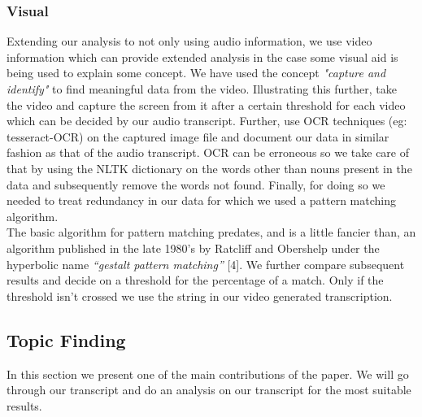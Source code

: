 \documentclass[conference]{IEEEtran}
\begin{document}
\subsubsection{Visual}
Extending our analysis to not only using audio information, we use video information which can provide extended analysis in the case some visual aid is being used to explain some concept. We have used the concept \textit{"capture and identify"} to find meaningful data from the video. Illustrating this further, take the video and capture the screen from it after a certain threshold for each video which can be decided by our audio transcript. Further, use OCR techniques (eg: tesseract-OCR) on the captured image file and document our data in similar fashion as that of the audio transcript. OCR can be erroneous so we take care of that by using the NLTK dictionary on the words other than nouns present in the data and subsequently remove the words not found. Finally, for doing so we needed to treat redundancy in our data for which we used a pattern matching algorithm.\\
\indent The basic algorithm for pattern matching predates, and is a little fancier than, an algorithm published in the late 1980’s by Ratcliff and Obershelp under the hyperbolic name \textit{“gestalt pattern matching”} [4]. We further compare subsequent results and decide on a threshold for the percentage of a match. Only if the threshold isn’t crossed we use the string in our video generated transcription.

\subsection{Topic Finding}
In this section we present one of the main contributions of the paper. We will go through our transcript and do an analysis on our transcript for the most suitable results.
\end{document}
